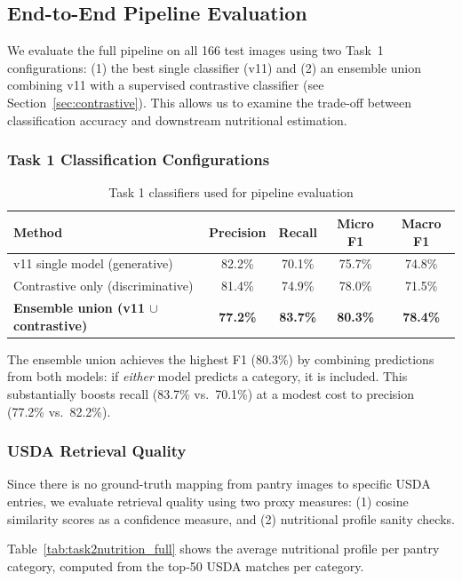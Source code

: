 \subsection{End-to-End Pipeline Evaluation}

We evaluate the full pipeline on all 166 test images using two Task~1 configurations: (1) the best single classifier (v11) and (2) an ensemble union combining v11 with a supervised contrastive classifier (see Section~\ref{sec:contrastive}). This allows us to examine the trade-off between classification accuracy and downstream nutritional estimation.

\subsubsection{Task 1 Classification Configurations}

\begin{table}[h]
\centering
\caption{Task 1 classifiers used for pipeline evaluation}
\label{tab:task1configs}
\begin{tabular}{lcccc}
\toprule
Method & Precision & Recall & Micro F1 & Macro F1 \\
\midrule
v11 single model (generative) & 82.2\% & 70.1\% & 75.7\% & 74.8\% \\
Contrastive only (discriminative) & 81.4\% & 74.9\% & 78.0\% & 71.5\% \\
\textbf{Ensemble union (v11 $\cup$ contrastive)} & \textbf{77.2\%} & \textbf{83.7\%} & \textbf{80.3\%} & \textbf{78.4\%} \\
\bottomrule
\end{tabular}
\end{table}

The ensemble union achieves the highest F1 (80.3\%) by combining predictions from both models: if \emph{either} model predicts a category, it is included. This substantially boosts recall (83.7\% vs.\ 70.1\%) at a modest cost to precision (77.2\% vs.\ 82.2\%).

\subsubsection{USDA Retrieval Quality}

Since there is no ground-truth mapping from pantry images to specific USDA entries, we evaluate retrieval quality using two proxy measures: (1) cosine similarity scores as a confidence measure, and (2) nutritional profile sanity checks.

Table~\ref{tab:task2nutrition_full} shows the average nutritional profile per pantry category, computed from the top-50 USDA matches per category.

